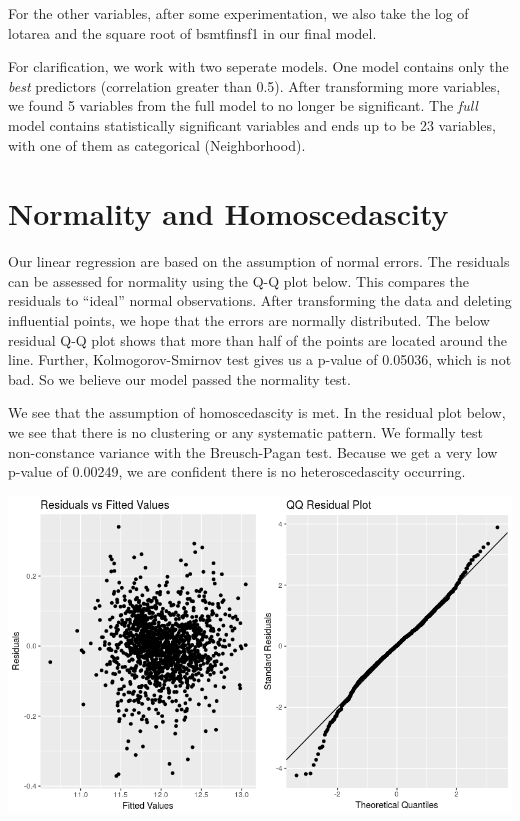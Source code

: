 \documentclass[12pt]{article}
\begin{document}
\begin{flushleft}
\begin{flushleft}
For the other variables, after some experimentation, we also take the log of lotarea and the square root of bsmtfinsf1 in our final model. 

For clarification, we work with two seperate models. One model contains only the \textit{best} predictors (correlation greater than 0.5). After transforming more variables, we found 5 variables from the full model to no longer be significant. The \textit{full} model contains statistically significant variables and ends up to be 23 variables, with one of them as categorical (Neighborhood). 
\end{flushleft}
\section{Normality and Homoscedascity}
\begin{flushleft}

Our linear regression are based on the assumption of normal errors. The residuals can be assessed for normality using the Q-Q plot below. This compares the residuals to “ideal” normal observations. After transforming the data and deleting influential points, we hope that the errors are normally distributed.
The below residual Q-Q plot shows that more than half of the points are located around the line. Further, Kolmogorov-Smirnov test gives us a p-value of 0.05036, which is not bad. So we believe our model passed the normality test.

We see that the assumption of homoscedascity is met. In the residual plot below, we see that there is no clustering or any systematic pattern. We formally test non-constance variance with the Breusch-Pagan test. Because we get a very low p-value of 0.00249, we are confident there is no heteroscedascity occurring.
\end{flushleft}
\centering
    \vspace*{0.5 cm}
    \includegraphics[scale = .5]{res.png}\\[1.0 cm]	
\begin{flushleft}
\centering

\end{flushleft}
\end{flushleft}
\end{document}
